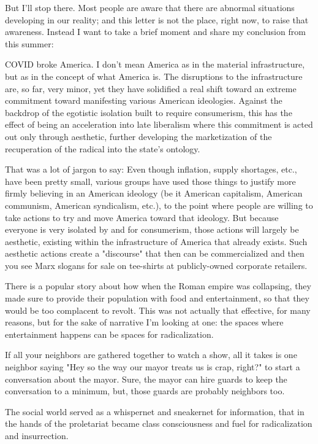 \documentclass[11pt]{article}
\begin{document}
\begin{itemize}
But I'll stop there. Most people are aware that there are abnormal situations developing in our reality; and this letter is not the place, right now, to raise that awareness. Instead I want to take a brief moment and share my conclusion from this summer:

COVID broke America. I don't mean America as in the material infrastructure, but as in the concept of what America is. The disruptions to the infrastructure are, so far, very minor, yet they have solidified a real shift toward an extreme commitment toward manifesting various American ideologies. Against the backdrop of the egotistic isolation built to require consumerism, this has the effect of being an acceleration into late liberalism where this commitment is acted out only through aesthetic, further developing the marketization of the recuperation of the radical into the state's ontology.

That was a lot of jargon to say: Even though inflation, supply shortages, etc., have been pretty small, various groups have used those things to justify more firmly believing in an American ideology (be it American capitalism, American communism, American syndicalism, etc.), to the point where people are willing to take actions to try and move America toward that ideology. But because everyone is very isolated by and for consumerism, those actions will largely be aesthetic, existing within the infrastructure of America that already exists. Such aesthetic actions create a "discourse" that then can be commercialized and then you see Marx slogans for sale on tee-shirts at publicly-owned corporate retailers.

There is a popular story about how when the Roman empire was collapsing, they made sure to provide their population with food and entertainment, so that they would be too complacent to revolt. This was not actually that effective, for many reasons, but for the sake of narrative I'm looking at one: the spaces where entertainment happens can be spaces for radicalization.

If all your neighbors are gathered together to watch a show, all it takes is one neighbor saying "Hey so the way our mayor treats us is crap, right?" to start a conversation about the mayor. Sure, the mayor can hire guards to keep the conversation to a minimum, but, those guards are probably neighbors too.

The social world served as a whispernet and sneakernet for information, that in the hands of the proletariat became class consciousness and fuel for radicalization and insurrection.


\end{itemize}
\end{document}
